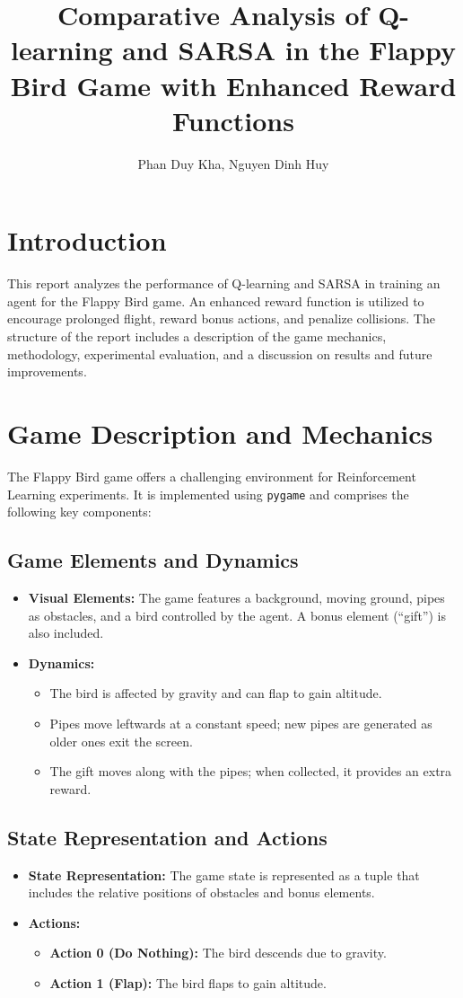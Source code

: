 \documentclass[9pt,a4paper]{article}
\title{\textbf{Comparative Analysis of Q-learning and SARSA in the Flappy Bird Game with Enhanced Reward Functions}}
\author{Phan Duy Kha, Nguyen Dinh Huy}
\date{}
\begin{document}
\maketitle

\section{Introduction}
This report analyzes the performance of Q-learning and SARSA in training an agent for the Flappy Bird game. An enhanced reward function is utilized to encourage prolonged flight, reward bonus actions, and penalize collisions. The structure of the report includes a description of the game mechanics, methodology, experimental evaluation, and a discussion on results and future improvements.

\section{Game Description and Mechanics}
The Flappy Bird game offers a challenging environment for Reinforcement Learning experiments. It is implemented using \texttt{pygame} and comprises the following key components:

\subsection{Game Elements and Dynamics}
\begin{itemize}
    \item \textbf{Visual Elements:} The game features a background, moving ground, pipes as obstacles, and a bird controlled by the agent. A bonus element (``gift'') is also included.
    \item \textbf{Dynamics:} 
    \begin{itemize}
        \item The bird is affected by gravity and can flap to gain altitude.
        \item Pipes move leftwards at a constant speed; new pipes are generated as older ones exit the screen.
        \item The gift moves along with the pipes; when collected, it provides an extra reward.
    \end{itemize}
\end{itemize}

\subsection{State Representation and Actions}
\begin{itemize}
    \item \textbf{State Representation:} The game state is represented as a tuple that includes the relative positions of obstacles and bonus elements.
    \item \textbf{Actions:} 
    \begin{itemize}
        \item \textbf{Action 0 (Do Nothing):} The bird descends due to gravity.
        \item \textbf{Action 1 (Flap):} The bird flaps to gain altitude.
    \end{itemize}
\end{itemize}
\end{document}
